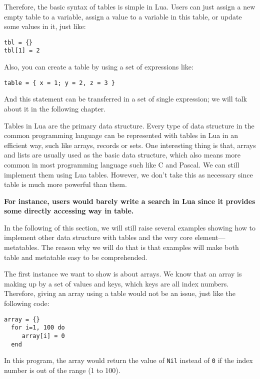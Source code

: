 Therefore, the basic syntax of tables is simple in Lua. Users can just assign a new empty table to a variable, assign a value to a variable in this table, or update some values in it, just like:
\begin{flushleft}
\tt tbl = \{\} \\
\tt tbl[1] = 2 \\
\end{flushleft}
Also, you can create a table by using a set of expressions like:
\begin{flushleft}
\tt table = \{ x = 1; y = 2, z = 3 \} \\
\end{flushleft}
And this statement can be transferred in a set of single expression; we will talk about it in the following chapter.

Tables in Lua are the primary data structure. Every type of data structure in the common programming language can be represented with tables in Lua in an efficient way, such like arrays, records or sets. One interesting thing is that, arrays and lists are usually used as the basic data structure, which also means more common in most programming language such like C and Pascal. We can still implement them using Lua tables. However, we don't take this as necessary since table is much more powerful than them. 

{\bf For instance, users would barely write a search in Lua since it provides some directly accessing way in table.}

In the following of this section, we will still raise several examples showing how to implement other data structure with tables and the very core element---metatables. The reason why we will do that is that examples will make both table and metatable easy to be comprehended.

The first instance we want to show is about arrays. We know that an array is making up by a set of values and keys, which keys are all index numbers. Therefore, giving an array using a table would not be an issue, just like the following code:
\begin{flushleft}
\tt array = \{\} \\
\tt ~~for i=1, 100 do\\
\tt ~~~~ array[i] = 0\\
\tt ~~end\\
\end{flushleft}
In this program, the array would return the value of {\tt Nil} instead of {\tt 0} if the index number is out of the range (1 to 100).

